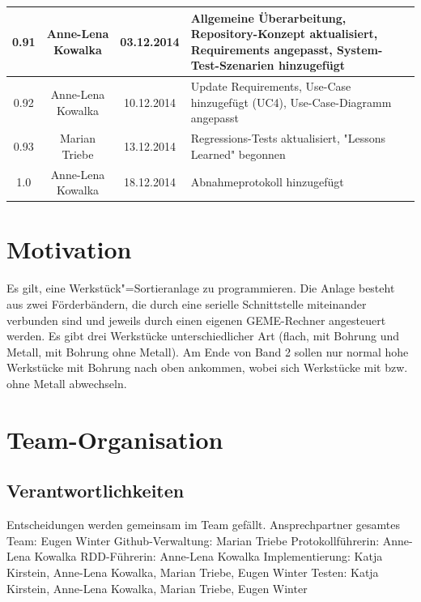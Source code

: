 \documentclass[oneside,a4paper,titlepage]{scrartcl}              %
\begin{document}
\begin{small}
\begin{center}
\begin{tabular}{|c|c|c|p{7.25cm}|}
      \hline
      0.91 & Anne-Lena Kowalka & 03.12.2014 & Allgemeine Überarbeitung, Repository-Konzept aktualisiert, Requirements angepasst, System-Test-Szenarien hinzugefügt\\
      \hline
      0.92 & Anne-Lena Kowalka & 10.12.2014 & Update Requirements, Use-Case hinzugefügt (UC4), Use-Case-Diagramm angepasst\\
      \hline
      0.93 & Marian Triebe & 13.12.2014 & Regressions-Tests aktualisiert, "Lessons Learned" \space begonnen\\
      \hline
      1.0 & Anne-Lena Kowalka & 18.12.2014 & Abnahmeprotokoll hinzugefügt \\
      \hline
    \end{tabular}
  \end{center}
\end{small}

\newpage

\pagestyle{empty}
\tableofcontents

\newpage

\pagestyle{plain}
\setcounter{page}{1}

\section{Motivation}
Es gilt, eine Werkstück"=Sortieranlage zu programmieren. Die Anlage besteht aus zwei
Förderbändern, die durch eine serielle Schnittstelle miteinander verbunden sind und jeweils durch
einen eigenen GEME-Rechner angesteuert werden.
Es gibt drei Werkstücke unterschiedlicher Art (flach, mit Bohrung und Metall, mit Bohrung ohne
Metall). Am Ende von Band 2 sollen nur normal hohe Werkstücke mit Bohrung nach oben
ankommen, wobei sich Werkstücke mit bzw. ohne Metall abwechseln.


\section{Team-Organisation}

\subsection{Verantwortlichkeiten}
Entscheidungen werden gemeinsam im Team gefällt.\newline
Ansprechpartner gesamtes Team: Eugen Winter\newline
Github-Verwaltung: Marian Triebe\newline
Protokollführerin: Anne-Lena Kowalka\newline
RDD-Führerin: Anne-Lena Kowalka\newline
Implementierung: Katja Kirstein, Anne-Lena Kowalka, Marian Triebe, Eugen Winter\newline
Testen: Katja Kirstein, Anne-Lena Kowalka, Marian Triebe, Eugen Winter\newline
\end{document}
